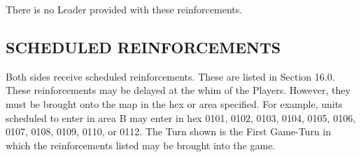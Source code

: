 \subsubsection{} There is no Leader provided with these reinforcements.

\subsection{SCHEDULED REINFORCEMENTS}

Both sides receive scheduled reinforcements. These are listed in Section 16.0. These reinforcements may be delayed at the whim of the Players. However, they must be brought onto the map in the hex or area specified. For example, units scheduled to enter in area B may enter in hex 0101, 0102, 0103, 0104, 0105, 0106, 0107, 0108, 0109, 0110, or 0112. The Turn shown is the First Game-Turn in which the reinforcements listed may be brought into the game.